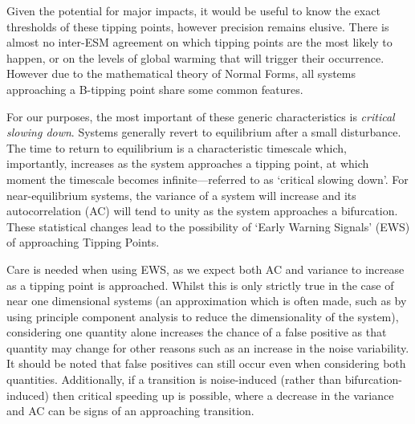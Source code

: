 Given the potential for major impacts, it would be useful to know the exact thresholds of
these tipping points, however precision remains elusive\cite{Steffen2018}.
There is almost no inter-ESM
agreement on which tipping points are the most likely to happen, or on the
levels of global warming that will trigger their
occurrence\cite{Drijfhout2015}.
However due to the mathematical theory of Normal 
Forms\cite{Strogatz2015,guckenheimer2013}, all systems approaching a
B-tipping point share some common features.

For our purposes, the most important of these generic characteristics
is \emph{critical slowing down}. Systems generally revert to  equilibrium after a small disturbance. 
The time to return to equilibrium is a characteristic timescale which, importantly, increases as the system 
approaches a tipping point, at which moment the timescale becomes 
infinite\cite{Scheffer2012}---referred to as `critical slowing down'. 
For near-equilibrium systems, the variance of a system will increase and its autocorrelation (AC)
will tend to unity as the system approaches a bifurcation\cite{Scheffer2009,Held2004}.
These statistical changes lead to the possibility of `Early Warning Signals' (EWS) of approaching Tipping Points.

Care is needed when using EWS, as we 
expect both AC and variance to increase as a tipping point is 
approached\cite{Ditlevsen2010}. Whilst this is only strictly true
in the case of near one dimensional systems (an approximation which is often made, such as by using principle component analysis to reduce the 
dimensionality of the system\cite{Held2004}), considering one quantity alone 
increases the chance of a false positive as that quantity may change for other reasons such as an increase in the noise variability. It should 
be noted that false positives can still occur even when considering 
both quantities.
Additionally, if a transition is noise-induced (rather than bifurcation-induced) then critical speeding up is possible, where
a decrease in the variance and AC can be signs of an approaching transition\cite{Titus2020}.

